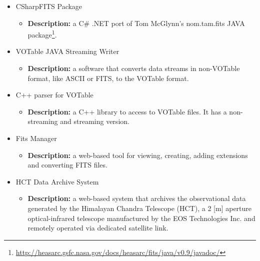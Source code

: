 \begin{itemize}
\begin{itemize}
\item CSharpFITS Package
\begin{itemize}
\item \textbf{Description:} a C\# .NET port of Tom McGlynn's nom.tam.fits JAVA
package\footnote{\url{http://heasarc.gsfc.nasa.gov/docs/heasarc/fits/java/v0.9/javadoc/}}.
\end{itemize}
\item VOTable JAVA Streaming Writer
\begin{itemize}
\item \textbf{Description:} a software that converts data streams in non-VOTable
format, like ASCII or FITS, to the VOTable format.
\end{itemize}
\item C++ parser for VOTable
\begin{itemize}
\item \textbf{Description:} a C++ library to access to VOTable files. It has a
non-streaming and streaming version.
\end{itemize}
\item Fits Manager
\begin{itemize}
\item \textbf{Description:} a web-based tool for viewing, creating, adding
extensions and converting FITS files.
\end{itemize}
\item HCT Data Archive System
\begin{itemize}
\item \textbf{Description:} a web-based system that archives the observational
data generated by the Himalayan Chandra Telescope (HCT), a 2 [m] aperture
optical-infrared telescope manufactured by the EOS Technologies Inc. and
remotely operated via dedicated satellite link.
\end{itemize}
\end{itemize}
\end{itemize}
